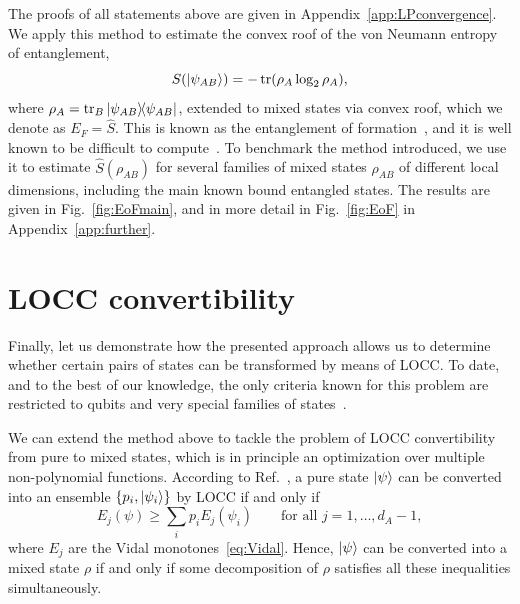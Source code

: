 \documentclass[11pt,a4paper]{report}
\newcounter{reptag}
\newif\iftags \tagsfalse   %
\newcommand{\reptagbox}[3]{\iftags\par\smallskip\noindent\refstepcounter{reptag}%
  \fcolorbox{#1}{#1!7}{\parbox{\dimexpr\linewidth-2\fboxsep-2\fboxrule\relax}{\small
  \textcolor{#1}{\textbf{[\thereptag]\ #2.}}\ #3}}\par\smallskip\fi}
\newcommand{\detail}[1]{\reptagbox{tagD}{More detail}{#1}}
\begin{document}
The proofs of all statements above are given in Appendix~\ref{app:LPconvergence}. We apply this method to estimate the convex roof of the von Neumann entropy of entanglement,
\begin{equation}\label{eq:vonNeumann}
    S(\ket{\psi_{AB}}) = -\tr(\rho_A \log_2 \rho_A),
\end{equation}
where $\rho_A = \tr_B \dyad{\psi_{AB}}$, extended to mixed states via convex roof, which we denote as $E_F=\widehat{S}$. This is known as the entanglement of formation~\cite{Bennett1996EoF}, and it is well known to be difficult to compute~\cite{Chen2005EoF}. To benchmark the method introduced, we use it to estimate $\widehat{S}(\rho_{AB})$ for several families of mixed states $\rho_{AB}$ of different local dimensions, including the main known bound entangled states. The results are given in Fig.~\ref{fig:EoFmain}, and in more detail in Fig.~\ref{fig:EoF} in Appendix~\ref{app:further}.
\detail{Discuss the $E_F$ results state by state: which states and why, why bound entangled states have small $E_F$, how close the lower and upper bounds get (e.g.\ only LB/UB $\approx0.5$ for $3\times3$ bound entangled states at $m=3$, against $\approx0.98$ for $E_1$), the exact two-qubit values as a sanity check, and run times per level. A table of the numbers behind Fig.~\ref{fig:EoFmain} (in the appendix if long) makes them citable.}



\chapter{LOCC convertibility}\label{ch:locc}
Finally, let us demonstrate how the presented approach allows us to determine whether certain pairs of states can be transformed by means of LOCC. To date, and to the best of our knowledge, the only criteria known for this problem are restricted to qubits and very special families of states~\cite{Chitambar2014LOCC,Gour2005InfiniteConditions}.

We can extend the method above to tackle the problem of LOCC convertibility from pure to mixed states, which is in principle an optimization over multiple non-polynomial functions.
According to Ref.~\cite{Jonathan_1999}, a pure state $\ket{\psi}$ can be converted into an ensemble $\{p_i, \ket{\psi_i}\}$ by LOCC if and only if
\begin{equation}\label{eq:JPcriterion}
    E_j(\psi) \geq \sum_i p_i E_j(\psi_i)\qquad \text{for all } j=1,\dots,d_A-1,
\end{equation}
where $E_j$ are the Vidal monotones~\eqref{eq:Vidal}.
Hence, $\ket{\psi}$ can be converted into a mixed state $\rho$ if and only if some decomposition of $\rho$ satisfies all these inequalities simultaneously.
\detail{Explain the Jonathan--Plenio criterion: what converting a pure state into an ensemble means (local operations with flagged outcomes), why it reduces to the Vidal monotones, and why converting into $\rho$ only needs \emph{some} decomposition (the flags are forgotten). A $2\times2$ example where the answer is known lets the reader check the method.}
\end{document}
